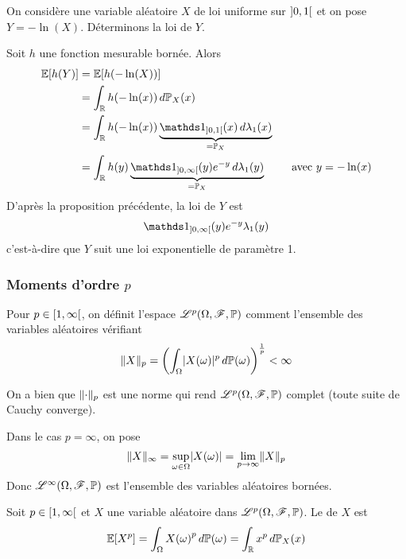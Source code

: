 \begin{exs}
    On considère une variable aléatoire \(X\) de loi uniforme sur \(\mathopen{}\left]0,1\right[\mathclose{}\)
    et on pose \(Y = -\ln(X)\). Déterminons la loi de \(Y\).

    Soit \(h\) une fonction mesurable bornée. Alors
    \begin{equation*}
        \begin{aligned}
            \bb E\ff{h(Y)} 
            &= \bb E\ff{h(-\ln(X))}\\
            &= \int_{\R} h(-\ln(x))\der\bb P_X(x)\\
            &= \int_{\R} h(-\ln(x)) \underbrace{\one_{\oo{0,1}}(x)\der\lambda_1(x)}_{=\bb P_X}\\
            &= \int_{\R} h(y) \underbrace{\one_{\oo{0,\infty}}(y) e^{-y}\der\lambda_1(y)}_{=\bb P_X}\qquad\text{ avec }y=-\ln(x)
        \end{aligned}
    \end{equation*}
    D'après la proposition précédente, la loi de \(Y\) est
    \begin{equation*}
        \one_{\oo{0,\infty}}(y)e^{-y}\lambda_1(y)
    \end{equation*}
    c'est-à-dire que \(Y\) suit une loi exponentielle de paramètre 1.
\end{exs}

\subsubsection{Moments d'ordre \(p\)} %

Pour \(p\in\mathopen{}\left[1,\infty\right[\mathclose{}\), on définit l'espace \(\mathscr{L}^p(\Omega, \mathscr{F}, \mathbb{P})\)
comment l'ensemble des variables aléatoires vérifiant
\begin{equation*}
    \mathopen{}\left\|X\right\|\mathclose{}_p = {\left(\int_{\Omega}\mathopen{}\left|X(\omega)\right|\mathclose{}^p\mathop{}\!{d}\mathbb{P}(\omega)\right)}^{\frac1p}<\infty
\end{equation*}

On a bien que \(\mathopen{}\left\|\cdot\right\|\mathclose{}_p\) est une norme qui rend \(\mathscr{L}^p(\Omega, \mathscr{F}, \mathbb{P})\) complet
(toute suite de Cauchy converge).

Dans le cas \(p=\infty\), on pose
\begin{equation*}
    \mathopen{}\left\|X\right\|\mathclose{}_\infty = \sup_{\omega\in\Omega}\mathopen{}\left|X(\omega)\right|\mathclose{}=\lim_{p\to\infty}\mathopen{}\left\|X\right\|\mathclose{}_p
\end{equation*}
Donc \(\mathscr{L}^\infty (\Omega,\mathscr{F},\mathbb{P})\) est l'ensemble des variables aléatoires bornées.

\begin{definition}
    Soit \(p\in\mathopen{}\left[1,\infty\right[\mathclose{}\) et \(X\) une variable aléatoire dans
    \(\mathscr{L}^p(\Omega, \mathscr{F}, \mathbb{P})\). Le  de
    \(X\) est
    \begin{equation*}
        \mathbb{E}\mathopen{}\left[X^p\right]\mathclose{} = \int_{\Omega} {X(\omega)}^p\mathop{}\!{d}\mathbb{P}(\omega) = \int_{\mathbb{R}}x^p\mathop{}\!{d}\mathbb{P}_X(x)
    \end{equation*}
\end{definition}

